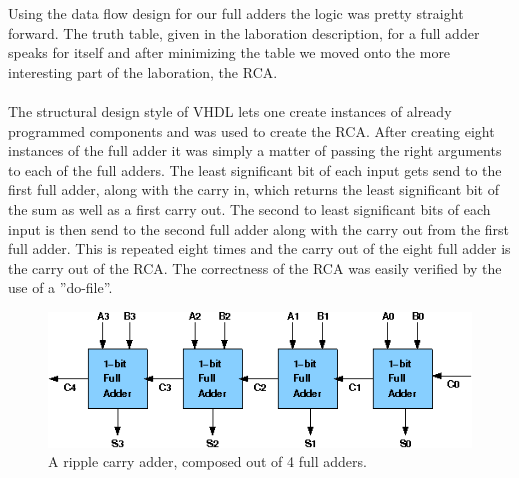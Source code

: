 \documentclass[a4paper,11pt]{article}
\begin{document}
\noindent
Using the data flow design for our full adders the logic was pretty straight 
forward. The truth table, given in the laboration description, for a full 
adder speaks for itself and after minimizing the table we moved onto the more 
interesting part of the laboration, the RCA.\\\\
\noindent
The structural design style of VHDL lets one create instances of already 
programmed components and was used to create the RCA. After creating eight 
instances of the full adder it was simply a matter of passing the right 
arguments to each of the full adders. The least significant bit of each input 
gets send to the first full adder, along with the carry in, which returns the 
least significant bit of the sum as well as a first carry out. The second to 
least significant bits of each input is then send to the second full adder 
along with the carry out from the first full adder. This is repeated eight 
times and the carry out of the eight full adder is the carry out of the RCA. 
The correctness of the RCA was easily verified by the use of a ''do-file''.

\begin{figure}[h]
    \centering
    \includegraphics[width=\linewidth]{RCA.png}
    \caption{A ripple carry adder, composed out of 4 full adders. ~\cite{RCA}}
    \label{RCA}
\end{figure}
\end{document}
